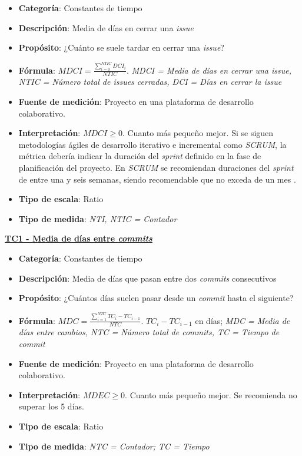 \begin{itemize}
	\item \textbf{Categoría}: Constantes de tiempo
	\item \textbf{Descripción}:  Media de días en cerrar una \textit{issue}
	\item \textbf{Propósito}: ¿Cuánto se suele tardar en cerrar una \textit{issue}? 
	\item \textbf{Fórmula}: $MDCI = \frac{\sum_{i=0}^{NTIC}DCI_i}{NTIC}$. \textit{MDCI = Media de días en cerrar una \textit{issue}, NTIC = Número total de \textit{issues} cerradas, DCI = Días en cerrar la \textit{issue}}
	\item \textbf{Fuente de medición}: Proyecto en una plataforma de desarrollo colaborativo.
	\item \textbf{Interpretación}: $MDCI \geq 0$. Cuanto más pequeño mejor. Si se siguen metodologías ágiles de desarrollo iterativo e incremental como \textit{SCRUM}, la métrica debería indicar la duración del \textit{sprint} definido en la fase de planificación del proyecto. En \textit{SCRUM} se recomiendan duraciones del \textit{sprint} de entre una y seis semanas, siendo recomendable que no exceda de un mes \cite{scrum_master_scrum_2019}.
	\item \textbf{Tipo de escala}: Ratio
	\item \textbf{Tipo de medida}: \textit{NTI, NTIC = Contador}
\end{itemize}

\textbf{\underline{TC1 - Media de días entre \textit{commits}}}

\begin{itemize}
	\item \textbf{Categoría}: Constantes de tiempo
	\item \textbf{Descripción}: Media de días que pasan entre dos \textit{commits} consecutivos
	\item \textbf{Propósito}: ¿Cuántos días suelen pasar desde un \textit{commit} hasta el siguiente?
	\item \textbf{Fórmula}: $MDC = \frac{\sum_{i=1}^{NTC} TC_i - TC_{i-1}}{NTC}$. $TC_i - TC_{i-1}$ en días; \textit{MDC = Media de días entre cambios, NTC = Número total de \textit{commits}, TC = Tiempo de \textit{commit}}
	\item \textbf{Fuente de medición}: Proyecto en una plataforma de desarrollo colaborativo.
	\item \textbf{Interpretación}: $MDEC \geq 0$. Cuanto más pequeño mejor. Se recomienda no superar los 5 días.
	\item \textbf{Tipo de escala}: Ratio
	\item \textbf{Tipo de medida}: \textit{NTC = Contador; TC = Tiempo}
\end{itemize}

